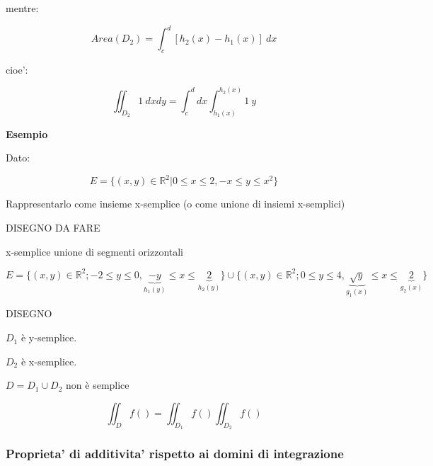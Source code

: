 \documentclass[../appunti-analisi.tex]{subfiles}
\begin{document}
mentre:

\[
    Area(D_2) = \int_{c}^{d} {[h_2(x) -h_1(x)]} \: dx 
\]

cioe':

\[
    \iint_{D_2} {1} \: d x d y = \int_{c}^{d} {dx \int_{h_1(x)}^{h_2(x)} {1} \: y }
\]



\textbf{Esempio} 

Dato:

\[
    E = \{(x,y) \in \mathbb{R}^{2}| 0 \le x \le 2, -x \le y \le x^{2}\}
\]

Rappresentarlo come insieme x-semplice (o come unione di insiemi x-semplici)


DISEGNO DA FARE


x-semplice unione di segmenti orizzontali

\[
    E = \{(x,y) \in \mathbb{R}^{2}; -2 \le y \le 0, \underbrace{-y}_\text{$h_1(y)$} \le x \le \underbrace{2}_\text{$h_2(y)$}\} \cup \{(x,y) \in \mathbb{R}^{2}; 0 \le y \le 4, \underbrace{\sqrt{y}}_\text{$g_1(x)$} \le  x \le \underbrace{2}_\text{$g_2(x)$}\}
\]


DISEGNO

$D_1$ è y-semplice.

$D_2$ è x-semplice.

$D = D_1 \cup D_2$ non è semplice

\[
    \iint_D {f()} = \iint_{D_1} {f()} \iint_{D_2} {f()}
\]

\subsubsection{Proprieta' di additivita' rispetto ai domini di integrazione}
\end{document}
